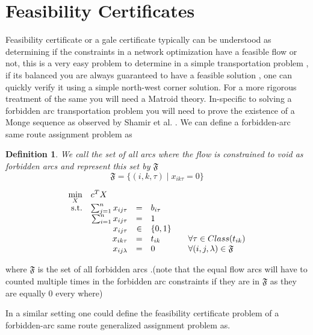\documentclass[a4paper]{article}
\newtheorem{definition}{Definition}[section]
\begin{document}
    \section{Feasibility Certificates}
    Feasibility certificate or a gale certificate\cite{gale1957} typically can be understood as determining if the constraints in a network optimization have a feasible flow or not, this is a very easy problem to determine in a simple transportation problem , if its balanced you are always guaranteed to have a feasible solution , one can quickly verify it using a simple north-west corner solution. For a more rigorous treatment of the same you will need a Matroid theory. In-specific to solving a forbidden arc transportation problem you will need to prove the existence of a Monge sequence as observed by Shamir et al. \cite{ADLER199321} . We can define a forbidden-arc same route assignment problem as
    
    \begin{definition}
        We call the set of all arcs where the flow is constrained to void as forbidden arcs and represent this set by $\mathfrak{F}$
        $$\mathfrak{F}=\{(i,k,\tau) \mid x_{ik\tau}=0 \}$$
    \end{definition}
    
            \begin{equation}
        \begin{array}{rrclcl}
        \displaystyle \min_{X} & \multicolumn{3}{l}{c^T X} \\
        \textrm{s.t.} & \sum_{j=1}^n x_{ij\tau}  & = & b_{i\tau} \\
        & \sum_{i=1}^n x_{ij\tau}  & = & 1 \\
        & x_{ij\tau} & \in &\{0,1\} \\
        & x_{ik\tau} &= & t_{ik} && \forall {\tau}\in Class(t_{ik}) \\
        & x_{ij\lambda} & = & 0 && \forall {(i,j,\lambda)}\in \mathfrak{F}\\
        \end{array}
        \end{equation}
        
    where $\mathfrak{F}$ is the set of all forbidden arcs .(note that the equal flow arcs will have to counted multiple times in the forbidden arc constraints if they are in $\mathfrak{F}$ as they are equally 0 every where)
    
    In a similar setting one could define the feasibility certificate problem of a forbidden-arc same route generalized assignment problem as.
    
\end{document}
